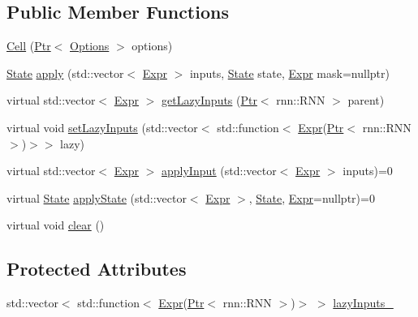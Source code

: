 \subsection*{Public Member Functions}
\begin{DoxyCompactItemize}
\item 
\hyperlink{classmarian_1_1rnn_1_1Cell_acc392c8adfb002c17993f02e6d3085a6}{Cell} (\hyperlink{namespacemarian_ad1a373be43a00ef9ce35666145137b08}{Ptr}$<$ \hyperlink{classmarian_1_1Options}{Options} $>$ options)
\item 
\hyperlink{structmarian_1_1rnn_1_1State}{State} \hyperlink{classmarian_1_1rnn_1_1Cell_a88c852cfe707ab973aa30780bd8e66bc}{apply} (std\+::vector$<$ \hyperlink{namespacemarian_a498d8baf75b754011078b890b39c8e12}{Expr} $>$ inputs, \hyperlink{structmarian_1_1rnn_1_1State}{State} state, \hyperlink{namespacemarian_a498d8baf75b754011078b890b39c8e12}{Expr} mask=nullptr)
\item 
virtual std\+::vector$<$ \hyperlink{namespacemarian_a498d8baf75b754011078b890b39c8e12}{Expr} $>$ \hyperlink{classmarian_1_1rnn_1_1Cell_a982be20556f9ba25eb76714ef264efeb}{get\+Lazy\+Inputs} (\hyperlink{namespacemarian_ad1a373be43a00ef9ce35666145137b08}{Ptr}$<$ rnn\+::\+R\+NN $>$ parent)
\item 
virtual void \hyperlink{classmarian_1_1rnn_1_1Cell_a3561734479d2121025c5e3f834ce2397}{set\+Lazy\+Inputs} (std\+::vector$<$ std\+::function$<$ \hyperlink{namespacemarian_a498d8baf75b754011078b890b39c8e12}{Expr}(\hyperlink{namespacemarian_ad1a373be43a00ef9ce35666145137b08}{Ptr}$<$ rnn\+::\+R\+NN $>$)$>$$>$ lazy)
\item 
virtual std\+::vector$<$ \hyperlink{namespacemarian_a498d8baf75b754011078b890b39c8e12}{Expr} $>$ \hyperlink{classmarian_1_1rnn_1_1Cell_a8e02cc3d239bc9947cd3200ff2995a01}{apply\+Input} (std\+::vector$<$ \hyperlink{namespacemarian_a498d8baf75b754011078b890b39c8e12}{Expr} $>$ inputs)=0
\item 
virtual \hyperlink{structmarian_1_1rnn_1_1State}{State} \hyperlink{classmarian_1_1rnn_1_1Cell_a4bd1bce7cf42fcc48387488e218af257}{apply\+State} (std\+::vector$<$ \hyperlink{namespacemarian_a498d8baf75b754011078b890b39c8e12}{Expr} $>$, \hyperlink{structmarian_1_1rnn_1_1State}{State}, \hyperlink{namespacemarian_a498d8baf75b754011078b890b39c8e12}{Expr}=nullptr)=0
\item 
virtual void \hyperlink{classmarian_1_1rnn_1_1Cell_a115c5d440c516f7ed7982bc08e66d87d}{clear} ()
\end{DoxyCompactItemize}
\subsection*{Protected Attributes}
\begin{DoxyCompactItemize}
\item 
std\+::vector$<$ std\+::function$<$ \hyperlink{namespacemarian_a498d8baf75b754011078b890b39c8e12}{Expr}(\hyperlink{namespacemarian_ad1a373be43a00ef9ce35666145137b08}{Ptr}$<$ rnn\+::\+R\+NN $>$)$>$ $>$ \hyperlink{classmarian_1_1rnn_1_1Cell_ad77a8ad9d648096996887ea57faa6fe2}{lazy\+Inputs\+\_\+}
\end{DoxyCompactItemize}


